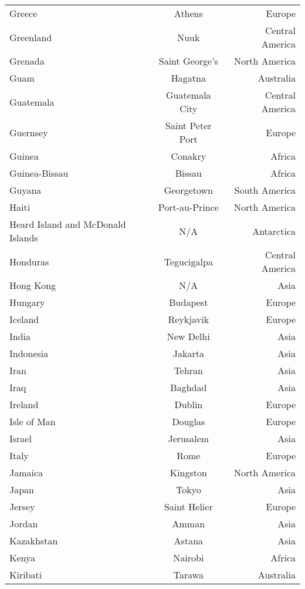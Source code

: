 \begin{longtable}{l|c|r}
Greece          & Athens            & Europe\\
Greenland       & Nuuk              & Central America\\
Grenada         & Saint George’s    & North America\\
Guam            & Hagatna           & Australia\\
Guatemala       & Guatemala City    & Central America\\
Guernsey        & Saint Peter Port  & Europe\\
Guinea          & Conakry           & Africa\\
Guinea-Bissau   & Bissau            & Africa\\
Guyana          & Georgetown        & South America\\
Haiti           & Port-au-Prince    & North America\\
Heard Island and McDonald Islands & N/A           & Antarctica\\
Honduras        & Tegucigalpa       & Central America\\
Hong Kong       & N/A               & Asia\\
Hungary         & Budapest          & Europe\\
Iceland         & Reykjavik         & Europe\\
India           & New Delhi         & Asia\\
Indonesia       & Jakarta           & Asia\\
Iran            & Tehran            & Asia\\
Iraq            & Baghdad           & 	Asia\\
Ireland         & Dublin            & Europe\\
Isle of Man     & Douglas           & Europe\\
Israel          & Jerusalem         & Asia\\
Italy           & Rome              & Europe\\
Jamaica         & Kingston          & North America\\
Japan           & Tokyo             & Asia\\
Jersey          & Saint Helier      & Europe\\
Jordan	        & Amman             & Asia\\
Kazakhstan      & Astana            & Asia\\
Kenya           & Nairobi           & Africa\\
Kiribati        & Tarawa            & Australia\\

\end{longtable}
